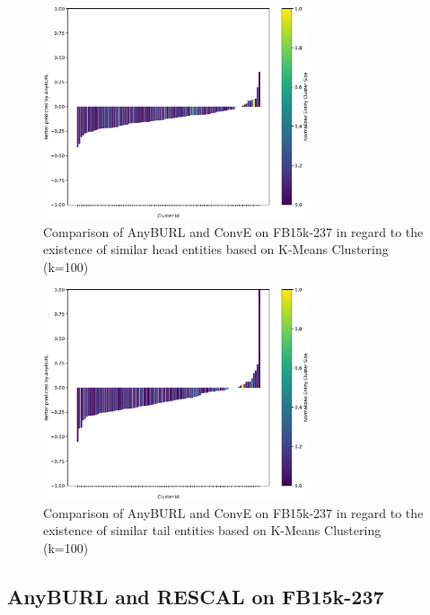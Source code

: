 \begin{figure}[H]
\centering
\includegraphics[width=0.7\textwidth]{images/head_cluster_100_anyburl_conve_fb15k.PNG}
\caption{Comparison of AnyBURL and ConvE on FB15k-237 in regard to the existence of similar head entities based on K-Means Clustering (k=100)}
\label{fig:head_cluster_100_anyburl_conve_fb15k}
\end{figure}

\begin{figure}[H]
\centering
\includegraphics[width=0.7\textwidth]{images/tail_cluster_100_anyburl_conve_fb15k.PNG}
\caption{Comparison of AnyBURL and ConvE on FB15k-237 in regard to the existence of similar tail entities based on K-Means Clustering (k=100)}
\label{fig:tail_cluster_100_anyburl_conve_fb15k}
\end{figure}

\subsection{AnyBURL and RESCAL on FB15k-237}


